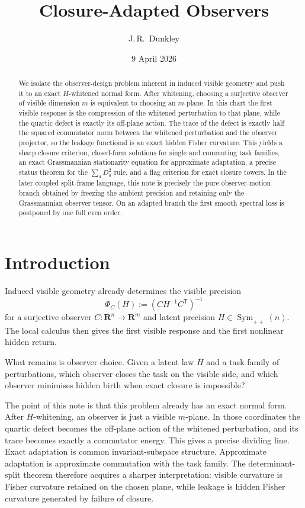 \documentclass[11pt,a4paper]{article}
\title{\textbf{Closure-Adapted Observers}}
\author{J.\,R.~Dunkley}
\date{9 April 2026}
\numberwithin{equation}{section}
\DeclareMathOperator{\Sym}{Sym}
\newcommand{\R}{\mathbf R}
\theoremstyle{thmcompact}
\theoremstyle{remark}
\begin{document}
\maketitle

\begin{abstract}
We isolate the observer-design problem inherent in induced visible geometry and push it to an exact $H$-whitened normal form. After whitening, choosing a surjective observer of visible dimension $m$ is equivalent to choosing an $m$-plane. In this chart the first visible response is the compression of the whitened perturbation to that plane, while the quartic defect is exactly its off-plane action. The trace of the defect is exactly half the squared commutator norm between the whitened perturbation and the observer projector, so the leakage functional is an exact hidden Fisher curvature. This yields a sharp closure criterion, closed-form solutions for single and commuting task families, an exact Grassmannian stationarity equation for approximate adaptation, a precise status theorem for the $\sum_a D_a^2$ rule, and a flag criterion for exact closure towers. In the later coupled split-frame language, this note is precisely the pure observer-motion branch obtained by freezing the ambient precision and retaining only the Grassmannian observer tensor. On an adapted branch the first smooth spectral loss is postponed by one full even order.
\end{abstract}

\section{Introduction}

Induced visible geometry already determines the visible precision
\begin{equation}
\Phi_C(H):=(CH^{-1}C^{\mathsf T})^{-1}
\label{eq:phi-def}
\end{equation}
for a surjective observer $C:\R^n\to\R^m$ and latent precision $H\in\Sym_{++}(n)$. The local calculus then gives the first visible response and the first nonlinear hidden return.

What remains is observer choice. Given a latent law $H$ and a task family of perturbations, which observer closes the task on the visible side, and which observer minimises hidden birth when exact closure is impossible?

The point of this note is that this problem already has an exact normal form. After $H$-whitening, an observer is just a visible $m$-plane. In those coordinates the quartic defect becomes the off-plane action of the whitened perturbation, and its trace becomes exactly a commutator energy. This gives a precise dividing line. Exact adaptation is common invariant-subspace structure. Approximate adaptation is approximate commutation with the task family. The determinant-split theorem therefore acquires a sharper interpretation: visible curvature is Fisher curvature retained on the chosen plane, while leakage is hidden Fisher curvature generated by failure of closure.
\end{document}
